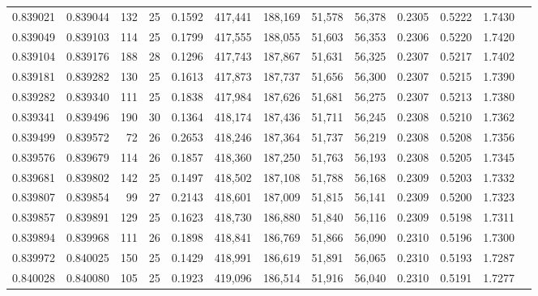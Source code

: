 \begin{tabular}{rrrrrrrrrrrrr}
0.839021 & 0.839044 &   132 &  25 &                                     0.1592 & 417,441 & 188,169 &  51,578 &  56,378 & 0.2305 & 0.5222 & 1.7430 \\
0.839049 & 0.839103 &   114 &  25 &                                     0.1799 & 417,555 & 188,055 &  51,603 &  56,353 & 0.2306 & 0.5220 & 1.7420 \\
0.839104 & 0.839176 &   188 &  28 &                                     0.1296 & 417,743 & 187,867 &  51,631 &  56,325 & 0.2307 & 0.5217 & 1.7402 \\
0.839181 & 0.839282 &   130 &  25 &                                     0.1613 & 417,873 & 187,737 &  51,656 &  56,300 & 0.2307 & 0.5215 & 1.7390 \\
0.839282 & 0.839340 &   111 &  25 &                                     0.1838 & 417,984 & 187,626 &  51,681 &  56,275 & 0.2307 & 0.5213 & 1.7380 \\
0.839341 & 0.839496 &   190 &  30 &                                     0.1364 & 418,174 & 187,436 &  51,711 &  56,245 & 0.2308 & 0.5210 & 1.7362 \\
0.839499 & 0.839572 &    72 &  26 &                                     0.2653 & 418,246 & 187,364 &  51,737 &  56,219 & 0.2308 & 0.5208 & 1.7356 \\
0.839576 & 0.839679 &   114 &  26 &                                     0.1857 & 418,360 & 187,250 &  51,763 &  56,193 & 0.2308 & 0.5205 & 1.7345 \\
0.839681 & 0.839802 &   142 &  25 &                                     0.1497 & 418,502 & 187,108 &  51,788 &  56,168 & 0.2309 & 0.5203 & 1.7332 \\
0.839807 & 0.839854 &    99 &  27 &                                     0.2143 & 418,601 & 187,009 &  51,815 &  56,141 & 0.2309 & 0.5200 & 1.7323 \\
0.839857 & 0.839891 &   129 &  25 &                                     0.1623 & 418,730 & 186,880 &  51,840 &  56,116 & 0.2309 & 0.5198 & 1.7311 \\
0.839894 & 0.839968 &   111 &  26 &                                     0.1898 & 418,841 & 186,769 &  51,866 &  56,090 & 0.2310 & 0.5196 & 1.7300 \\
0.839972 & 0.840025 &   150 &  25 &                                     0.1429 & 418,991 & 186,619 &  51,891 &  56,065 & 0.2310 & 0.5193 & 1.7287 \\
0.840028 & 0.840080 &   105 &  25 &                                     0.1923 & 419,096 & 186,514 &  51,916 &  56,040 & 0.2310 & 0.5191 & 1.7277 \\

\end{tabular}
